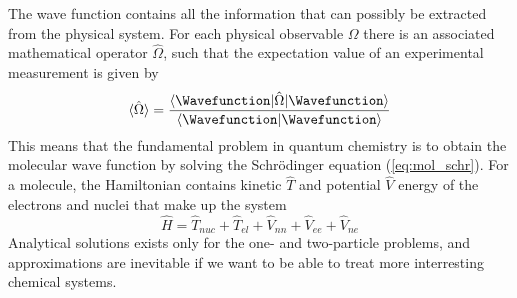 The wave function contains all the information that can possibly be extracted from the 
physical system. For each physical observable $\Omega$ there is an associated mathematical 
operator $\hat{\Omega}$, such that the expectation value of an experimental measurement is 
given by
\begin{equation}
    \langle \hat{\Omega}\rangle = \frac{\langle\Wavefunction|\hat{\Omega}|\Wavefunction\rangle}
    {\langle\Wavefunction|\Wavefunction\rangle}
\end{equation}
This means that the fundamental problem in quantum chemistry is to obtain the molecular
wave function by solving the Schr\"{o}dinger equation (\ref{eq:mol_schr}). For a molecule,
the Hamiltonian contains kinetic $\hat{T}$ and potential $\hat{V}$ energy of the 
electrons and nuclei that make up the system
\begin{equation}
    \hat{H} = \hat{T}_{nuc} + \hat{T}_{el} + \hat{V}_{nn} + \hat{V}_{ee} + \hat{V}_{ne}
\end{equation}
Analytical solutions exists only for the one- and two-particle problems, and approximations are
inevitable if we want to be able to treat more interresting chemical systems. 

